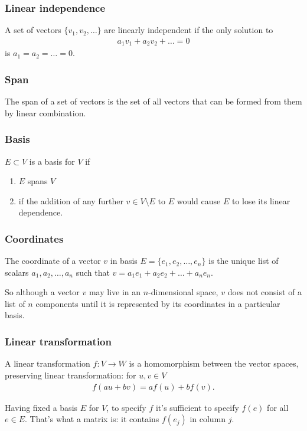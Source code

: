 \subsubsection{Linear independence}
A set of vectors $\{v_1, v_2, \ldots\}$ are linearly independent if the only
solution to
\begin{align*}
  a_1v_1 + a_2v_2 + \ldots = 0
\end{align*}
is $a_1 = a_2 = \ldots = 0$.


\subsubsection{Span}
The span of a set of vectors is the set of all vectors that can be formed from
them by linear combination.


\subsubsection{Basis}
$E \subset V$ is a basis for $V$ if
\begin{enumerate}
\item $E$ spans $V$
\item if the addition of any further $v \in V\setminus E$ to $E$ would cause
  $E$ to lose its linear dependence.
\end{enumerate}


\subsubsection{Coordinates}
The coordinate of a vector $v$ in basis $E = \{e_1, e_2, \ldots, e_n\}$ is the
unique list of scalars $a_1, a_2, \ldots, a_n$ such that
$v = a_1e_1 + a_2e_2 + \ldots + a_ne_n$.

So although a vector $v$ may live in an $n$-dimensional space, $v$ does not
consist of a list of $n$ components until it is represented by its coordinates
in a particular basis.


\subsubsection{Linear transformation}
A linear transformation $f: V \to W$ is a homomorphism between the vector
spaces, preserving linear transformation: for $u, v \in V$
\begin{align*}
  f(au + bv) = af(u) + bf(v).
\end{align*}

Having fixed a basis $E$ for $V$, to specify $f$ it's sufficient to specify
$f(e)$ for all $e \in E$. That's what a matrix is: it contains $f(e_j)$ in
column $j$.


